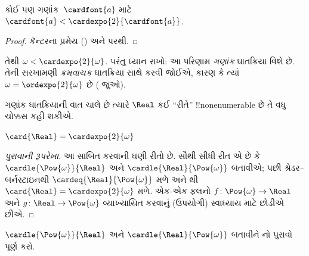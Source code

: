 \documentclass[../../../include/open-logic-section]{subfiles}
\begin{document}
\begin{cor}
કોઈ પણ ગણાંક~$\cardfont{a}$ માટે
$\cardfont{a} < \cardexpo{2}{\cardfont{a}}$.
\end{cor}

\begin{proof}
કૅન્ટરના પ્રમેય
() અને
 પરથી.
\end{proof}
\noindent
તેથી $\omega < \cardexpo{2}{\omega}$.
પરંતુ ધ્યાન રાખો: આ પરિણામ \emph{ગણાંક}
ઘાતક્રિયા વિશે છે. તેની સરખામણી \emph{ક્રમવાચક}
ઘાતક્રિયા સાથે કરવી જોઈએ, કારણ કે ત્યાં
$\omega = \ordexpo{2}{\omega}$ છે
( જુઓ).

ગણાંક ઘાતક્રિયાની વાત ચાલે છે ત્યારે
$\Real$ કઈ ``રીતે'' !!{nonenumerable} છે તે
વધુ ચોક્કસ કહી શકીએ.

\begin{thm}
$\card{\Real} = \cardexpo{2}{\omega}$
\end{thm}

\begin{proof}[પુરાવાની રૂપરેખા]
આ સાબિત કરવાની ઘણી રીતો છે. સૌથી સીધી રીત એ
છે કે $\cardle{\Pow{\omega}}{\Real}$ અને
$\cardle{\Real}{\Pow{\omega}}$ બતાવીએ; પછી
શ્રેડર--બર્નસ્ટાઇનથી $\cardeq{\Real}{\Pow{\omega}}$
મળે અને 
થી $\card{\Real} = \cardexpo{2}{\omega}$ મળે.
એક-એક ફલનો $f \colon \Pow{\omega} \to \Real$
અને $g \colon \Real \to \Pow{\omega}$ વ્યાખ્યાયિત
કરવાનું (ઉપયોગી) સ્વાધ્યાય માટે છોડીએ છીએ.
\end{proof}

\begin{prob}
$\cardle{\Pow{\omega}}{\Real}$ અને
$\cardle{\Real}{\Pow{\omega}}$ બતાવીને
નો
પુરાવો પૂર્ણ કરો.
\end{prob}
\end{document}
